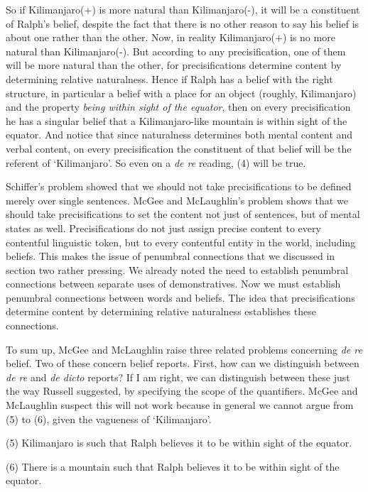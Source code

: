\documentclass[
  10pt,
  letterpaper,
  DIV=11,
  numbers=noendperiod,
  twoside]{scrartcl}
\begin{document}
So if Kilimanjaro(+) is more natural than Kilimanjaro(-), it will be a
constituent of Ralph's belief, despite the fact that there is no other
reason to say his belief is about one rather than the other. Now, in
reality Kilimanjaro(+) is no more natural than Kilimanjaro(-). But
according to any precisification, one of them will be more natural than
the other, for precisifications determine content by determining
relative naturalness. Hence if Ralph has a belief with the right
structure, in particular a belief with a place for an object (roughly,
Kilimanjaro) and the property \emph{being within sight of the equator},
then on every precisification he has a singular belief that a
Kilimanjaro-like mountain is within sight of the equator. And notice
that since naturalness determines both mental content and verbal
content, on every precisification the constituent of that belief will be
the referent of `Kilimanjaro'. So even on a \emph{de re} reading, (4)
will be true.

Schiffer's problem showed that we should not take precisifications to be
defined merely over single sentences. McGee and McLaughlin's problem
shows that we should take precisifications to set the content not just
of sentences, but of mental states as well. Precisifications do not just
assign precise content to every contentful linguistic token, but to
every contentful entity in the world, including beliefs. This makes the
issue of penumbral connections that we discussed in section two rather
pressing. We already noted the need to establish penumbral connections
between separate uses of demonstratives. Now we must establish penumbral
connections between words and beliefs. The idea that precisifications
determine content by determining relative naturalness establishes these
connections.

To sum up, McGee and McLaughlin raise three related problems concerning
\emph{de re} belief. Two of these concern belief reports. First, how can
we distinguish between \emph{de re} and \emph{de dicto} reports? If I am
right, we can distinguish between these just the way Russell suggested,
by specifying the scope of the quantifiers. McGee and McLaughlin suspect
this will not work because in general we cannot argue from (5) to (6),
given the vagueness of `Kilimanjaro'.

(5) Kilimanjaro is such that Ralph believes it to be within sight of the
equator.

(6) There is a mountain such that Ralph believes it to be within sight
of the equator.
\end{document}
